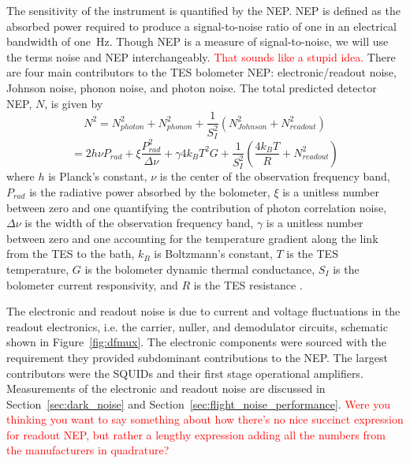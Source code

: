 The sensitivity of the instrument is quantified by the \ac{NEP}. 
\ac{NEP} is defined as the absorbed power required to produce a signal-to-noise ratio of one in an electrical bandwidth of one~Hz. 
Though \ac{NEP} is a measure of signal-to-noise, we will use the terms noise and \ac{NEP} interchangeably. 
\textcolor{red}{That sounds like a stupid idea.}
There are four main contributors to the \ac{TES} bolometer \ac{NEP}: electronic/readout noise, Johnson noise, phonon noise, and photon noise. 
The total predicted detector \ac{NEP}, $N$, is given by 
\begin{equation}
N^{2} = N_{photon}^2 + N_{phonon}^2 + \frac{1}{S_I^2} ( N_{Johnson}^2 + N_{readout}^2 )
\end{equation}
\begin{equation}
= 2h\nu P_{rad} + \xi \frac{P_{rad}^2}{\Delta \nu} + \gamma 4k_{B} T^2 G + \frac{1}{S_I^2} (\frac{4k_{B}T}{R} + N_{readout}^2 )
\label{eq:nep}
\end{equation}
where $h$ is Planck's constant, $\nu$ is the center of the observation frequency band, $P_{rad}$ is the radiative power absorbed by the bolometer, $\xi$ is a unitless number between zero and one quantifying the contribution of photon correlation noise, $\Delta \nu$ is the width of the observation frequency band, $\gamma$ is a unitless number between zero and one accounting for the temperature gradient along the link from the \ac{TES} to the bath, $k_{B}$ is Boltzmann's constant, $T$ is the \ac{TES} temperature, $G$ is the bolometer dynamic thermal conductance, $S_{I}$ is the bolometer current responsivity, and $R$ is the \ac{TES} resistance \citep{Mather1982a}. 

The electronic and readout noise is due to current and voltage fluctuations in the readout electronics, i.e. the carrier, nuller, and demodulator circuits, schematic shown in Figure~\ref{fig:dfmux}. 
The electronic components were sourced with the requirement they provided subdominant contributions to the \ac{NEP}. 
The largest contributors were the \ac{SQUID}s and their first stage operational amplifiers. 
Measurements of the electronic and readout noise are discussed in Section~\ref{sec:dark_noise} and Section~\ref{sec:flight_noise_performance}.
\textcolor{red}{Were you thinking you want to say something about how there's no nice succinct expression for readout \ac{NEP}, but rather a lengthy expression adding all the numbers from the manufacturers in quadrature?}

